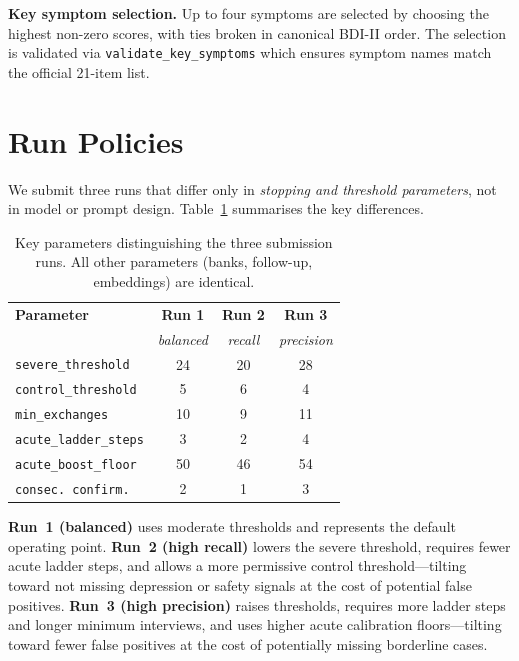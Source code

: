 \documentclass[]{ceurart}
\begin{document}
\textbf{Key symptom selection.}
Up to four symptoms are selected by choosing the highest non-zero scores, with ties broken in canonical BDI-II order.
The selection is validated via \texttt{validate\_key\_symptoms} which ensures symptom names match the official 21-item list.


\section{Run Policies}\label{sec:runs}

We submit three runs that differ only in \emph{stopping and threshold parameters}, not in model or prompt design.
Table~\ref{tab:runs} summarises the key differences.

\begin{table}[t]
\caption{Key parameters distinguishing the three submission runs. All other parameters (banks, follow-up, embeddings) are identical.}
\label{tab:runs}
\centering
\small
\begin{tabular}{lccc}
\toprule
\textbf{Parameter} & \textbf{Run 1} & \textbf{Run 2} & \textbf{Run 3} \\
 & \emph{balanced} & \emph{recall} & \emph{precision} \\
\midrule
\texttt{severe\_threshold}      & 24 & 20 & 28 \\
\texttt{control\_threshold}     &  5 &  6 &  4 \\
\texttt{min\_exchanges}         & 10 &  9 & 11 \\
\texttt{acute\_ladder\_steps}   &  3 &  2 &  4 \\
\texttt{acute\_boost\_floor}    & 50 & 46 & 54 \\
\texttt{consec.\ confirm.}     &  2 &  1 &  3 \\
\bottomrule
\end{tabular}
\end{table}

\textbf{Run~1 (balanced)} uses moderate thresholds and represents the default operating point.
\textbf{Run~2 (high recall)} lowers the severe threshold, requires fewer acute ladder steps, and allows a more permissive control threshold---tilting toward not missing depression or safety signals at the cost of potential false positives.
\textbf{Run~3 (high precision)} raises thresholds, requires more ladder steps and longer minimum interviews, and uses higher acute calibration floors---tilting toward fewer false positives at the cost of potentially missing borderline cases.
\end{document}

